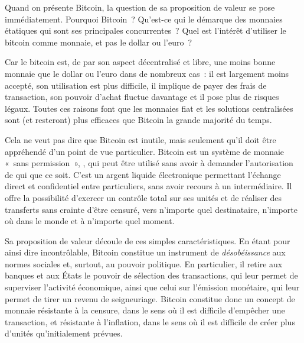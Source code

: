 Quand on présente Bitcoin, la question de sa proposition de valeur se pose immédiatement. Pourquoi Bitcoin~? Qu'est-ce qui le démarque des monnaies étatiques qui sont ses principales concurrentes~? Quel est l'intérêt d'utiliser le bitcoin comme monnaie, et pas le dollar ou l'euro~?

Car le bitcoin est, de par son aspect décentralisé et libre, une moins bonne monnaie que le dollar ou l'euro dans de nombreux cas~: il est largement moins accepté, son utilisation est plus difficile, il implique de payer des frais de transaction, son pouvoir d'achat fluctue davantage et il pose plus de risques légaux. Toutes ces raisons font que les monnaies fiat et les solutions centralisées sont (et resteront) plus efficaces que Bitcoin la grande majorité du temps.

Cela ne veut pas dire que Bitcoin est inutile, mais seulement qu'il doit être appréhendé d'un point de vue particulier. Bitcoin est un système de monnaie «~sans permission~», , qui peut être utilisé sans avoir à demander l'autorisation de qui que ce soit. C'est un argent liquide électronique permettant l'échange direct et confidentiel entre particuliers, sans avoir recours à un intermédiaire. Il offre la possibilité d'exercer un contrôle total sur ses unités et de réaliser des transferts sans crainte d'être censuré, vers n'importe quel destinataire, n'importe où dans le monde et à n'importe quel moment.

Sa proposition de valeur découle de ces simples caractéristiques. En étant pour ainsi dire incontrôlable, Bitcoin constitue un instrument de \emph{désobéissance} aux normes sociales et, surtout, au pouvoir politique. En particulier, il retire aux banques et aux États le pouvoir de sélection des transactions, qui leur permet de superviser l'activité économique, ainsi que celui sur l'émission monétaire, qui leur permet de tirer un revenu de seigneuriage. Bitcoin constitue donc un concept de monnaie résistante à la censure, dans le sens où il est difficile d'empêcher une transaction, et résistante à l'inflation, dans le sens où il est difficile de créer plus d'unités qu'initialement prévues.


